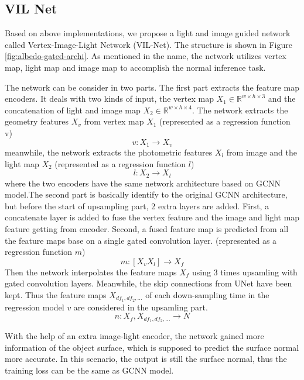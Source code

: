 \documentclass[border=15pt, multi, tikz]{article}
\begin{document}
	
	
	

\subsection{VIL Net}
Based on above implementations, we propose a light and image guided network called Vertex-Image-Light Network (VIL-Net). 
The structure is shown in Figure \ref{fig:albedo-gated-archi}. As mentioned in the name, the network utilizes vertex map, light map and image map to accomplish the normal inference task. 

The network can be consider in two parts. The first part extracts the feature map encoders. It deals with two kinds of input, the vertex map $ X_1 \in \mathbb{R}^{w\times h\times3}$ and the concatenation of light and image map $ X_2 \in \mathbb{R}^{w\times h\times4} $. The network extracts the geometry features $ X_v $ from vertex map $ X_1 $ (represented as a regression function v)
\[ v: X_1 \rightarrow X_v \]
meanwhile, the network extracts the photometric features $ X_l $ from image and the light map $ X_2 $ (represented as a regression function $ l $)
\[ l: X_2 \rightarrow X_l \]
where the two encoders have the same network architecture based on GCNN model.The second part is basically identify to the original GCNN architecture, but before the start of upsampling part, 2 extra layers are added. First, a concatenate layer is added to fuse the vertex feature and the image and light map feature getting from encoder. 
Second, a fused feature map is predicted from all the feature maps base on a single gated convolution layer. (represented as a regression function $ m $)
\[ m: [X_v X_l] \rightarrow X_f \]
Then the network interpolates the feature maps $ X_f $ using 3 times upsamling with gated convolution layers. Meanwhile, the skip connections from UNet have been kept. Thus the feature maps $ X_{df_1, df_2, ...} $ of each down-sampling time in the regression model $ v $ are considered in the upsamling part.
\[ n: X_f, X_{df_1, df_2, ...} \rightarrow N \]

With the help of an extra image-light encoder, the network gained more information of the object surface, which is supposed to predict the surface normal more accurate. In this scenario, the output is still the surface normal, thus the training loss can be the same as GCNN model.
\end{document}
